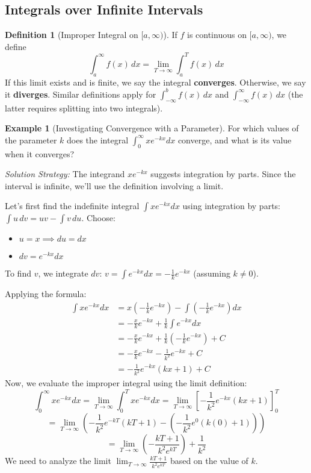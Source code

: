 \documentclass[11pt]{article}
\theoremstyle{definition}
\newtheorem{definition}[theorem]{Definition}
\newtheorem{example}[theorem]{Example}
\theoremstyle{remark}
\begin{document}
\subsection{Integrals over Infinite Intervals}

\begin{definition}[Improper Integral on $[a, \infty)$]
If $f$ is continuous on $[a, \infty)$, we define
\[ \int_a^\infty f(x)\,dx = \lim_{T \to \infty} \int_a^T f(x)\,dx \]
If this limit exists and is finite, we say the integral \textbf{converges}. Otherwise, we say it \textbf{diverges}. Similar definitions apply for $\int_{-\infty}^b f(x)\,dx$ and $\int_{-\infty}^\infty f(x)\,dx$ (the latter requires splitting into two integrals).
\end{definition}

\begin{example}[Investigating Convergence with a Parameter] \label{ex:k_param}
For which values of the parameter $k$ does the integral $\int_0^\infty x e^{-kx} dx$ converge, and what is its value when it converges?

\textit{Solution Strategy:} The integrand $x e^{-kx}$ suggests integration by parts. Since the interval is infinite, we'll use the definition involving a limit.

Let's first find the indefinite integral $\int x e^{-kx} dx$ using integration by parts: $\int u \, dv = uv - \int v \, du$.
Choose:
\begin{itemize}
    \item $u = x \implies du = dx$
    \item $dv = e^{-kx} dx$
\end{itemize}
To find $v$, we integrate $dv$: $v = \int e^{-kx} dx = -\frac{1}{k} e^{-kx}$ (assuming $k \neq 0$).

Applying the formula:
\begin{align*} \int x e^{-kx} dx &= x \left(-\frac{1}{k} e^{-kx}\right) - \int \left(-\frac{1}{k} e^{-kx}\right) dx \\ &= -\frac{x}{k} e^{-kx} + \frac{1}{k} \int e^{-kx} dx \\ &= -\frac{x}{k} e^{-kx} + \frac{1}{k} \left(-\frac{1}{k} e^{-kx}\right) + C \\ &= -\frac{x}{k} e^{-kx} - \frac{1}{k^2} e^{-kx} + C \\ &= -\frac{1}{k^2} e^{-kx} (kx + 1) + C \end{align*}
Now, we evaluate the improper integral using the limit definition:
\[ \int_0^\infty x e^{-kx} dx = \lim_{T \to \infty} \int_0^T x e^{-kx} dx = \lim_{T \to \infty} \left[ -\frac{1}{k^2} e^{-kx} (kx + 1) \right]_0^T \]
\[ = \lim_{T \to \infty} \left( -\frac{1}{k^2} e^{-kT} (kT + 1) - \left(-\frac{1}{k^2} e^{0} (k(0) + 1)\right) \right) \]
\[ = \lim_{T \to \infty} \left( -\frac{kT+1}{k^2 e^{kT}} \right) + \frac{1}{k^2} \]
We need to analyze the limit $\lim_{T \to \infty} \frac{kT+1}{k^2 e^{kT}}$ based on the value of $k$.


\end{example}
\end{document}
